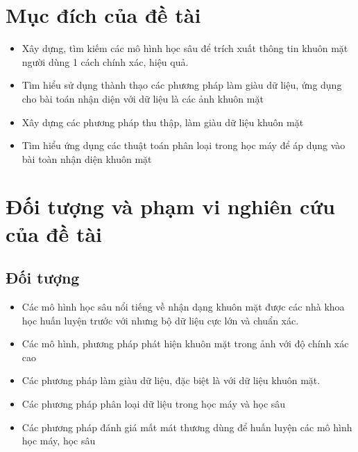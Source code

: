 
\section{Mục đích của đề tài}

\begin{itemize}
      \item Xây dựng, tìm kiếm các mô hình học sâu để trích xuất thông tin khuôn mặt
            người dùng 1 cách chính xác, hiệu quả.
      \item Tìm hiểu sử dụng thành thạo các phương pháp làm giàu dữ liệu,
            ứng dụng cho bài toán nhận diện với dữ liệu là các ảnh khuôn mặt
      \item Xây dựng các phương pháp thu thập, làm giàu dữ liệu khuôn mặt
      \item Tìm hiểu ứng dụng các thuật toán phân loại trong học máy để
            áp dụng vào bài toàn nhận diện khuôn mặt
\end{itemize}

\section{Đối tượng và phạm vi nghiên cứu của đề tài}
\subsection{Đối tượng}
\begin{itemize}
      \item Các mô hình học sâu nổi tiếng về nhận dạng khuôn mặt được các nhà khoa học huấn luyện trước với nhưng bộ dữ liệu
            cực lớn và chuẩn xác.
      \item Các mô hình, phương pháp phát hiện khuôn mặt trong ảnh với độ chính xác cao
      \item Các phương pháp làm giàu dữ liệu, đặc biệt là với dữ liệu khuôn mặt.
      \item Các phương pháp phân loại dữ liệu trong học máy và học sâu
      \item Các phương pháp đánh giá mất mát thương dùng để huấn luyện các mô hình học máy, học sâu
\end{itemize}

